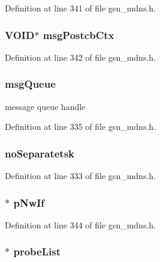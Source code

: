 Definition at line 341 of file gsn\_\-mdns.h.

\hypertarget{a00140_a87ae49d5f0fac444209c04cb6498bf36}{
\subsubsection[{msgPostcbCtx}]{\setlength{\rightskip}{0pt plus 5cm}VOID$\ast$ {\bf msgPostcbCtx}}}
\label{a00140_a87ae49d5f0fac444209c04cb6498bf36}


Definition at line 342 of file gsn\_\-mdns.h.

\hypertarget{a00140_a3525baeed8d9f795ed0c44437f548da2}{
\subsubsection[{msgQueue}]{ {\bf msgQueue}}}
\label{a00140_a3525baeed8d9f795ed0c44437f548da2}
message queue handle 

Definition at line 335 of file gsn\_\-mdns.h.

\hypertarget{a00140_a0bf759fe262766b44a9b023c66f75f07}{
\subsubsection[{noSeparatetsk}]{ {\bf noSeparatetsk}}}
\label{a00140_a0bf759fe262766b44a9b023c66f75f07}


Definition at line 333 of file gsn\_\-mdns.h.

\hypertarget{a00140_a162db5da6960431ec48a784907bd6fb9}{
\subsubsection[{pNwIf}]{$\ast$ {\bf pNwIf}}}
\label{a00140_a162db5da6960431ec48a784907bd6fb9}


Definition at line 344 of file gsn\_\-mdns.h.

\hypertarget{a00140_adc2ceee26fcd1703b832c55805ec0fd6}{
\subsubsection[{probeList}]{$\ast$ {\bf probeList}}}
\label{a00140_adc2ceee26fcd1703b832c55805ec0fd6}


